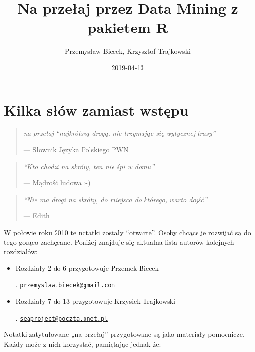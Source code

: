 \documentclass[polish,]{book}
\title{Na przełaj przez Data Mining z pakietem R}
\author{Przemysław Biecek, Krzysztof Trajkowski}
\date{2019-04-13}
\begin{document}
\maketitle

{
\hypersetup{linkcolor=black}
\setcounter{tocdepth}{2}
\tableofcontents
}
\hypertarget{part_1}{%
\chapter{Kilka słów zamiast wstępu}\label{part_1}}

\begin{quote}
\emph{na przełaj ``najkrótszą drogą, nie trzymając się wytycznej trasy''}

--- Słownik Języka Polskiego PWN
\end{quote}

\begin{quote}
\emph{``Kto chodzi na skróty, ten nie śpi w domu''}

--- Mądrość ludowa ;-)
\end{quote}

\begin{quote}
\emph{``Nie ma drogi na skróty, do miejsca do którego, warto dojść''}

--- Edith
\end{quote}

W połowie roku 2010 te notatki zostały ``otwarte''. Osoby chcące je rozwijać
są do tego gorąco zachęcane. Poniżej znajduje się aktualna lista autorów kolejnych
rozdziałów:

\begin{itemize}
\item
  Rozdziały 2 do 6 przygotowuje Przemek Biecek

  . \href{mailto:przemyslaw.biecek@gmail.com}{\nolinkurl{przemyslaw.biecek@gmail.com}}
\item
  Rozdziały 7 do 13 przygotowuje Krzysiek Trajkowski

  . \href{mailto:seaproject@poczta.onet.pl}{\nolinkurl{seaproject@poczta.onet.pl}}
\end{itemize}

Notatki zatytułowane „na przełaj'' przygotowane są jako materiały pomocnicze.
Każdy może z nich korzystać, pamiętając jednak że:
\end{document}
